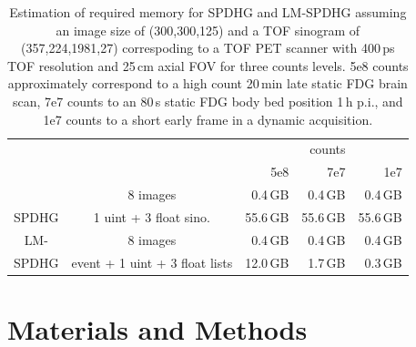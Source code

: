 \begin{table}
\begin{center}
\footnotesize
\begin{tabular}{ c c r r r}
         &                       &            & counts      & \\ 
         &                       & 5e8        & 7e7         & 1e7 \\ \hline
         & 8 images              &   0.4\,GB  &   0.4\,GB   &   0.4\,GB \\
SPDHG    & 1 uint + 3 float sino.&  55.6\,GB  &  55.6\,GB   &  55.6\,GB \\ \hline
LM-      & 8 images              &   0.4\,GB  &   0.4\,GB   &   0.4\,GB \\
SPDHG    & event + 1 uint + 3 float lists &  12.0\,GB  &   1.7\,GB   &   0.3\,GB
\end{tabular}
\end{center}
\caption{Estimation of required memory for SPDHG and LM-SPDHG assuming an image size of (300,300,125)
         and a TOF sinogram of (357,224,1981,27) correspoding to a TOF PET scanner with 400\,ps TOF
         resolution and 25\,cm axial FOV for three counts levels. 5e8 counts approximately correspond
         to a high count 20\,min late static FDG brain scan, 
         7e7 counts to an 80\,s static FDG body bed position 1\,h p.i., 
         and 1e7 counts to a short early frame in a dynamic acquisition.}
\label{tab:mem}
\end{table}


\section{Materials and Methods}

